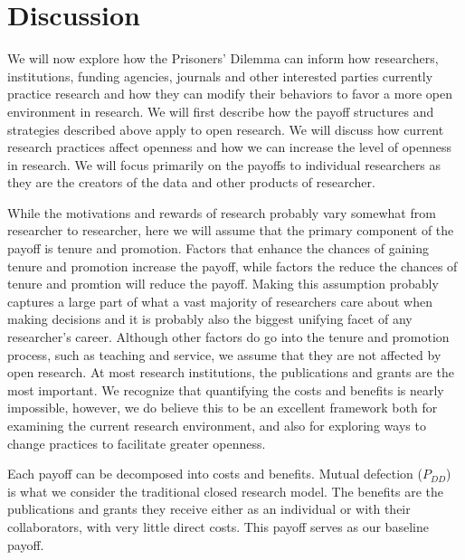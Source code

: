 \documentclass[11pt]{article} %
\begin{document}
\section{Discussion}
We will now explore how the Prisoners' Dilemma can inform how researchers, institutions, funding agencies, journals and other interested parties currently practice research and how they can modify their behaviors to favor a more open environment in research. We will first describe how the payoff structures and strategies described above apply to open research. We will discuss how current research practices affect openness and how we can increase the level of openness in research. We will focus primarily on the payoffs to individual researchers as they are the creators of the data and other products of researcher.

While the motivations and rewards of research probably vary somewhat from researcher to researcher, here we will assume that the primary component of the payoff is tenure and promotion. Factors that enhance the chances of gaining tenure and promotion increase the payoff, while factors the reduce the chances of tenure and promtion will reduce the payoff. Making this assumption probably captures a large part of what a vast majority of researchers care about when making decisions and it is probably also the biggest unifying facet of any researcher's career. Although other factors do go into the tenure and promotion process, such as teaching and service, we assume that they are not affected by open research.  At most research institutions, the publications and grants are the most important. We recognize that quantifying the costs and benefits is nearly impossible, however, we do believe this to be an excellent framework both for examining the current research environment, and also for exploring ways to change practices to facilitate greater openness.

Each payoff can be decomposed into costs and benefits. Mutual defection ($P_{DD}$) is what we  consider the traditional closed research model. The benefits are the publications and grants they receive either as an individual or with their collaborators, with very little direct costs. This payoff serves as our baseline payoff. 
\end{document}

